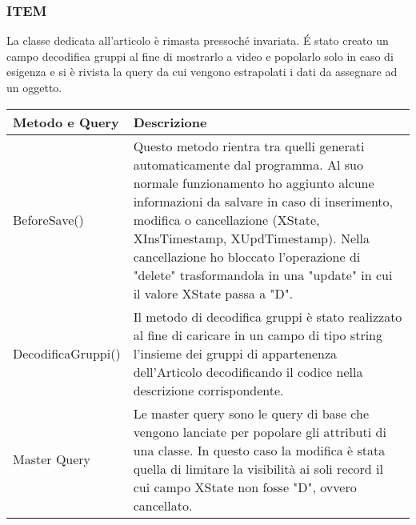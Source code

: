\subsubsection{ITEM}
La classe dedicata all'articolo è rimasta pressoché invariata. \'E stato creato un campo decodifica gruppi al fine di mostrarlo a video e popolarlo solo in caso di esigenza e si è rivista la query da cui vengono estrapolati i dati da assegnare ad un oggetto.

\begin{center}
	\begin{tabular}{ p{3cm}|p{} }
		\hline
		\textbf{Metodo e Query} & \textbf{Descrizione}\\
		\hline
		BeforeSave() & Questo metodo rientra tra quelli generati automaticamente dal programma. Al suo normale funzionamento ho aggiunto alcune informazioni da salvare in caso di inserimento, modifica o cancellazione (XState, XInsTimestamp, XUpdTimestamp). Nella cancellazione ho bloccato l'operazione di "delete" trasformandola in una "update" in cui il valore XState passa a "D".\\
		\hline
		DecodificaGruppi() & Il metodo di decodifica gruppi è stato realizzato al fine di caricare in un campo di tipo string l'insieme dei gruppi di appartenenza dell'Articolo decodificando il codice nella descrizione corrispondente.\\
		\hline
		Master Query & Le master query sono le query di base che vengono lanciate per popolare gli attributi di una classe. In questo caso la modifica è stata quella di limitare la visibilità ai soli record il cui campo XState non fosse "D", ovvero cancellato.\\
	
	\end{tabular}

\end{center}

